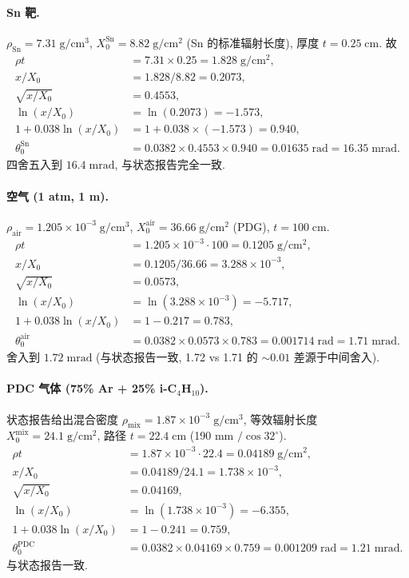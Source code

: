 \paragraph{Sn 靶.} $\rho_\mathrm{Sn} = 7.31\;\mathrm{g/cm^3}$, $X_0^\mathrm{Sn} = 8.82\;\mathrm{g/cm^2}$ (Sn 的标准辐射长度), 厚度 $t = 0.25\;\mathrm{cm}$. 故
\begin{align}
  \rho t &= 7.31 \times 0.25 = 1.828\;\mathrm{g/cm^2}, \\
  x/X_0 &= 1.828 / 8.82 = 0.2073, \\
  \sqrt{x/X_0} &= 0.4553, \\
  \ln(x/X_0) &= \ln(0.2073) = -1.573, \\
  1 + 0.038 \ln(x/X_0) &= 1 + 0.038 \times (-1.573) = 0.940, \\
  \theta_0^\mathrm{Sn} &= 0.0382 \times 0.4553 \times 0.940
  = 0.01635\;\mathrm{rad}
  = 16.35\;\mathrm{mrad}.
\end{align}
四舍五入到 $16.4\;\mathrm{mrad}$, 与状态报告完全一致.

\paragraph{空气 (1 atm, 1 m).} $\rho_\mathrm{air} = 1.205 \times 10^{-3}\;\mathrm{g/cm^3}$, $X_0^\mathrm{air} = 36.66\;\mathrm{g/cm^2}$ (PDG), $t = 100\;\mathrm{cm}$.
\begin{align}
  \rho t &= 1.205\times 10^{-3} \cdot 100 = 0.1205\;\mathrm{g/cm^2}, \\
  x/X_0 &= 0.1205 / 36.66 = 3.288 \times 10^{-3}, \\
  \sqrt{x/X_0} &= 0.0573, \\
  \ln(x/X_0) &= \ln(3.288\times 10^{-3}) = -5.717, \\
  1 + 0.038 \ln(x/X_0) &= 1 - 0.217 = 0.783, \\
  \theta_0^\mathrm{air} &= 0.0382 \times 0.0573 \times 0.783
  = 0.001714\;\mathrm{rad} = 1.71\;\mathrm{mrad}.
\end{align}
舍入到 $1.72\;\mathrm{mrad}$ (与状态报告一致, 1.72 vs 1.71 的 $\sim 0.01$ 差源于中间舍入).

\paragraph{PDC 气体 (75\% Ar + 25\% i-C$_4$H$_{10}$).} 状态报告给出混合密度 $\rho_\mathrm{mix} = 1.87\times 10^{-3}\;\mathrm{g/cm^3}$, 等效辐射长度 $X_0^\mathrm{mix} = 24.1\;\mathrm{g/cm^2}$, 路径 $t = 22.4\;\mathrm{cm}$ (190 mm $/\cos 32^\circ$).
\begin{align}
  \rho t &= 1.87\times 10^{-3} \cdot 22.4 = 0.04189\;\mathrm{g/cm^2}, \\
  x/X_0 &= 0.04189 / 24.1 = 1.738 \times 10^{-3}, \\
  \sqrt{x/X_0} &= 0.04169, \\
  \ln(x/X_0) &= \ln(1.738\times 10^{-3}) = -6.355, \\
  1 + 0.038 \ln(x/X_0) &= 1 - 0.241 = 0.759, \\
  \theta_0^\mathrm{PDC} &= 0.0382 \times 0.04169 \times 0.759
  = 0.001209\;\mathrm{rad} = 1.21\;\mathrm{mrad}.
\end{align}
与状态报告一致.


